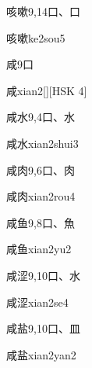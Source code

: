 \begin{entry}{咳嗽}{9,14}{⼝、⼝}
  \begin{phonetics}{咳嗽}{ke2sou5}
  \end{phonetics}
\end{entry}

\begin{entry}{咸}{9}{⼝}
  \begin{phonetics}{咸}{xian2}[][HSK 4]
  \end{phonetics}
\end{entry}

\begin{entry}{咸水}{9,4}{⼝、⽔}
  \begin{phonetics}{咸水}{xian2shui3}
  \end{phonetics}
\end{entry}

\begin{entry}{咸肉}{9,6}{⼝、⾁}
  \begin{phonetics}{咸肉}{xian2rou4}
  \end{phonetics}
\end{entry}

\begin{entry}{咸鱼}{9,8}{⼝、⿂}
  \begin{phonetics}{咸鱼}{xian2yu2}
  \end{phonetics}
\end{entry}

\begin{entry}{咸涩}{9,10}{⼝、⽔}
  \begin{phonetics}{咸涩}{xian2se4}
  \end{phonetics}
\end{entry}

\begin{entry}{咸盐}{9,10}{⼝、⽫}
  \begin{phonetics}{咸盐}{xian2yan2}
  \end{phonetics}
\end{entry}

